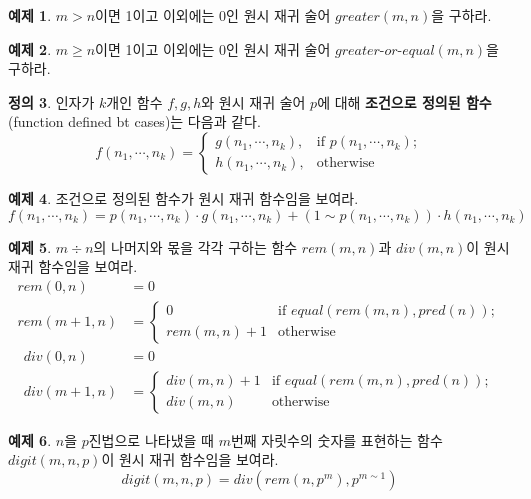 \documentclass[b5paper, 10pt]{book}
\theoremstyle{definition}
\newtheorem{defn}{정의}[chapter]
\newtheorem{ex}[defn]{예제}
\begin{document}
\begin{ex}
    $m > n$이면 1이고 이외에는 0인 원시 재귀 술어 $greater(m,n)$을 구하라. 
\end{ex}
\begin{ex}
    $m \ge n$이면 1이고 이외에는 0인 원시 재귀 술어 $greater\text{-}or\text{-}equal(m,n)$을 구하라.
\end{ex}
\begin{defn}
    인자가 $k$개인 함수 $f, g, h$와 원시 재귀 술어 $p$에 대해 
    \textbf{조건으로 정의된 함수}(function defined bt cases)는 다음과 같다.
    $$f(n_1, \cdots, n_k) = 
    \begin{cases}
        g(n_1, \cdots , n_k), & \text{if } p(n_1, \cdots, n_k); \\
        h(n_1, \cdots, n_k),  & \text{otherwise}
    \end{cases}$$
\end{defn}
\begin{ex}
    조건으로 정의된 함수가 원시 재귀 함수임을 보여라.
    $$f(n_1, \cdots, n_k) = p(n_1, \cdots, n_k) \cdot g(n_1, \cdots, n_k) +
    (1\sim p(n_1, \cdots, n_k)) \cdot h(n_1, \cdots, n_k)$$
\end{ex}
\begin{ex}
    $m \div n$의 나머지와 몫을 각각 구하는 함수 $rem(m,n)$과 $div(m,n)$이 원시 재귀 함수임을 보여라.  
    \begin{align*}
        rem(0,n) &= 0 \\
        rem(m+1, n) &= 
        \begin{cases}
            0 & \text{if } equal(rem(m,n), pred(n)); \\ 
            rem(m,n) + 1 & \text{otherwise}
        \end{cases} 
    \end{align*}
    \begin{align*}
        div(0,n) &= 0 \\
        div(m+1, n) &= 
        \begin{cases}
            div(m, n) + 1 & \text{if } equal(rem(m,n), pred(n)); \\ 
            div(m,n) & \text{otherwise}
        \end{cases} 
    \end{align*}
\end{ex}
\begin{ex}
    $n$을 $p$진법으로 나타냈을 때 $m$번째 자릿수의 숫자를 표현하는 함수 $digit(m,n,p)$이 원시 재귀 함수임을 보여라.
    $$digit(m,n,p) = div(rem(n,p^m), p^{m \sim 1})$$
\end{ex}
\end{document}
